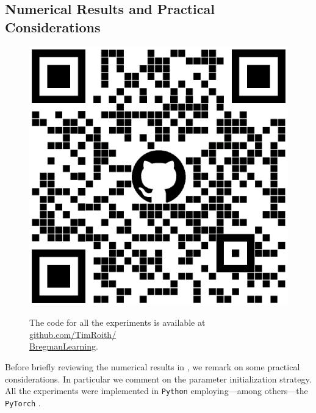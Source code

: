 \subsection{Numerical Results and Practical Considerations}\label{sec:Bregnum}
%
%
\begin{figure}
\begin{center}
\includegraphics[width=.4\textwidth]{atelier/Breg_dist/BregQR.png}
\end{center}
The code for all the experiments is available at \href{https://github.com/TimRoith/BregmanLearning}{github.com/TimRoith/}\\
\href{https://github.com/TimRoith/BregmanLearning}{BregmanLearning}.
\end{figure}
Before briefly reviewing the numerical results in \cite[Sec. 4]{bungert2022bregman}, we remark on some practical considerations. In particular we comment on the parameter initialization strategy. All the experiments were implemented in \texttt{Python} \cite{van1995python} employing---among others---the \texttt{PyTorch} \cite{paszke2019pytorch}.
%
